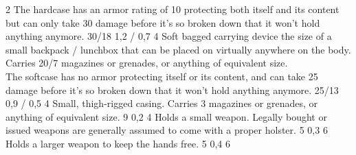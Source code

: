 \begin{multicols}{2}
{        The hardcase has an armor rating of 10 protecting
        both itself and its content
        but can only take 30 damage before it's so broken down
        that it won't hold anything anymore.}
    {30/18}
    {1,2 / 0,7}
    {4}
    {Soft bagged carrying device the size of
        a small backpack / lunchbox that can be placed on virtually anywhere on the body.
        Carries 20/7 magazines or grenades, or anything of equivalent size.\\
        The softcase has no armor protecting itself or its content,
        and can take 25 damage before it's so broken down
        that it won't hold anything anymore.}
    {25/13}
    {0,9 / 0,5}
    {4}
    {Small, thigh-rigged casing.
        Carries 3 magazines or grenades, or anything of equivalent size.}
    {9}
    {0,2}
    {4}
    {Holds a small weapon.
        Legally bought or issued weapons are generally assumed to come with a proper holster.}
    {5}
    {0,3}
    {6}
    {Holds a larger weapon to keep the hands free.}
    {5}
    {0,4}
    {6}
\end{multicols}

